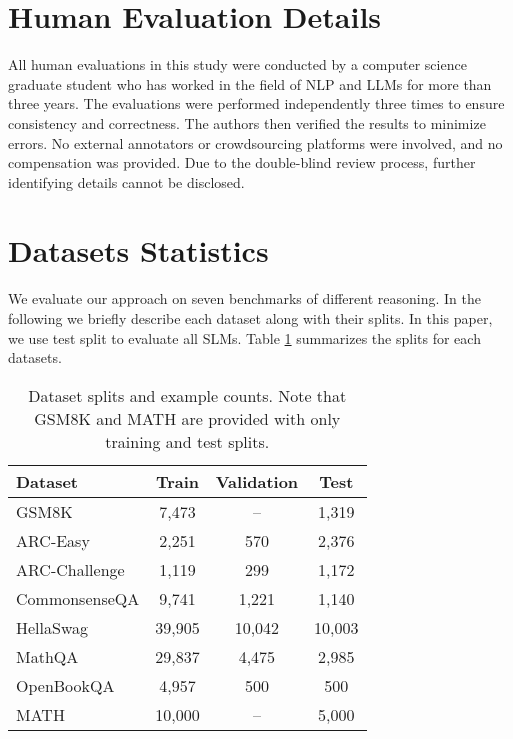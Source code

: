 
\section{Human Evaluation Details}

All human evaluations in this study were conducted by a computer science graduate student who has worked in the field of NLP and LLMs for more than three years. The evaluations were performed independently three times to ensure consistency and correctness. The authors then verified the results to minimize errors. No external annotators or crowdsourcing platforms were involved, and no compensation was provided. Due to the double-blind review process, further identifying details cannot be disclosed.




\section{Datasets Statistics}
\label{sec:datasets}

We evaluate our approach on seven benchmarks of different reasoning. In the following we briefly describe each dataset along with their splits. In this paper, we use test split to evaluate all SLMs. Table \ref{tab:dataset_splits} summarizes the splits for each datasets.


\begin{table}[ht]
\centering
\begin{tabular}{lccc}
\toprule
\textbf{Dataset}   & \textbf{Train} & \textbf{Validation} & \textbf{Test} \\
\midrule
GSM8K              & 7,473        & --                  & 1,319       \\
ARC-Easy           & 2,251        & 570                 & 2,376       \\
ARC-Challenge      & 1,119        & 299                 & 1,172       \\
CommonsenseQA      & 9,741        & 1,221               & 1,140       \\
HellaSwag          & 39,905       & 10,042              & 10,003      \\
MathQA             & 29,837       & 4,475               & 2,985       \\
OpenBookQA         & 4,957        & 500                 & 500         \\
MATH               & 10,000       & --                  & 5,000       \\
\bottomrule
\end{tabular}
\caption{Dataset splits and example counts. Note that GSM8K and MATH are provided with only training and test splits.}
\label{tab:dataset_splits}
\end{table}



